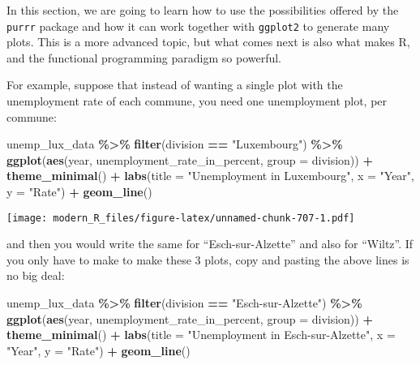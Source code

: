 \documentclass[
]{article}
\newenvironment{Shaded}{\begin{snugshade}}{\end{snugshade}}
\newcommand{\DataTypeTok}[1]{\textcolor[rgb]{0.13,0.29,0.53}{#1}}
\newcommand{\KeywordTok}[1]{\textcolor[rgb]{0.13,0.29,0.53}{\textbf{#1}}}
\newcommand{\NormalTok}[1]{#1}
\newcommand{\OperatorTok}[1]{\textcolor[rgb]{0.81,0.36,0.00}{\textbf{#1}}}
\newcommand{\StringTok}[1]{\textcolor[rgb]{0.31,0.60,0.02}{#1}}
\begin{document}
In this section, we are going to learn how to use the possibilities offered by the \texttt{purrr} package
and how it can work together with \texttt{ggplot2} to generate many plots. This is a more advanced topic,
but what comes next is also what makes R, and the functional programming paradigm so powerful.

For example, suppose that instead of wanting a single plot with the unemployment rate of each
commune, you need one unemployment plot, per commune:

\begin{Shaded}
\begin{Highlighting}[]
\NormalTok{unemp\_lux\_data }\OperatorTok{\%\textgreater{}\%}
\StringTok{  }\KeywordTok{filter}\NormalTok{(division }\OperatorTok{==}\StringTok{ "Luxembourg"}\NormalTok{) }\OperatorTok{\%\textgreater{}\%}
\StringTok{  }\KeywordTok{ggplot}\NormalTok{(}\KeywordTok{aes}\NormalTok{(year, unemployment\_rate\_in\_percent, }\DataTypeTok{group =}\NormalTok{ division)) }\OperatorTok{+}
\StringTok{  }\KeywordTok{theme\_minimal}\NormalTok{() }\OperatorTok{+}
\StringTok{  }\KeywordTok{labs}\NormalTok{(}\DataTypeTok{title =} \StringTok{"Unemployment in Luxembourg"}\NormalTok{, }\DataTypeTok{x =} \StringTok{"Year"}\NormalTok{, }\DataTypeTok{y =} \StringTok{"Rate"}\NormalTok{) }\OperatorTok{+}
\StringTok{  }\KeywordTok{geom\_line}\NormalTok{()}
\end{Highlighting}
\end{Shaded}

\texttt{[image: modern\_R\_files/figure-latex/unnamed-chunk-707-1.pdf]}

and then you would write the same for ``Esch-sur-Alzette'' and also for ``Wiltz''. If you only have to
make to make these 3 plots, copy and pasting the above lines is no big deal:

\begin{Shaded}
\begin{Highlighting}[]
\NormalTok{unemp\_lux\_data }\OperatorTok{\%\textgreater{}\%}
\StringTok{  }\KeywordTok{filter}\NormalTok{(division }\OperatorTok{==}\StringTok{ "Esch{-}sur{-}Alzette"}\NormalTok{) }\OperatorTok{\%\textgreater{}\%}
\StringTok{  }\KeywordTok{ggplot}\NormalTok{(}\KeywordTok{aes}\NormalTok{(year, unemployment\_rate\_in\_percent, }\DataTypeTok{group =}\NormalTok{ division)) }\OperatorTok{+}
\StringTok{  }\KeywordTok{theme\_minimal}\NormalTok{() }\OperatorTok{+}
\StringTok{  }\KeywordTok{labs}\NormalTok{(}\DataTypeTok{title =} \StringTok{"Unemployment in Esch{-}sur{-}Alzette"}\NormalTok{, }\DataTypeTok{x =} \StringTok{"Year"}\NormalTok{, }\DataTypeTok{y =} \StringTok{"Rate"}\NormalTok{) }\OperatorTok{+}
\StringTok{  }\KeywordTok{geom\_line}\NormalTok{()}
\end{Highlighting}
\end{Shaded}
\end{document}
